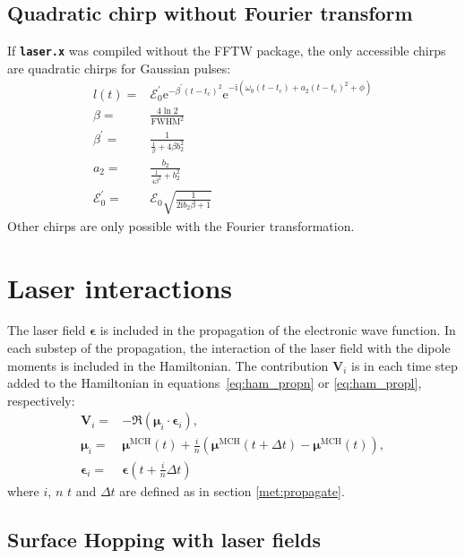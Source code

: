 \documentclass[a4paper,10pt,DIV=15,openany]{scrbook}
\newcommand{\ttt}[1]{\textbf{\texttt{#1}}}
\newcommand{\E}{\ensuremath{\mathrm{e}}}
\newcommand{\I}{\ensuremath{\mathrm{i}}}
\newcommand{\VEC}[1]{\ensuremath{\mathbf{#1}}}
\begin{document}
\subsection{Quadratic chirp without Fourier transform}

If \ttt{laser.x} was compiled without the FFTW package, the only accessible chirps are quadratic chirps for Gaussian pulses:
\begin{align}
  l(t)=&
  \mathcal{E}_0^\prime
  \E^{-\beta^\prime(t-t_c)^2}
  \E^{-\I\left(
    \omega_0(t-t_c)+a_2(t-t_c)^2+\phi
  \right)}\\
  \beta=&\frac{4\ln 2}{\mathrm{FWHM}^2}\\
  \beta^\prime=&\frac{1}{\frac{1}{\beta}+4\beta b_2^2}\\
  a_2=&\frac{b_2}{\frac{1}{4\beta^2}+b^2_2}\\
  \mathcal{E}_0^\prime=&\mathcal{E}_0\sqrt{\frac{1}{2\I b_2\beta+1}}
\end{align}
Other chirps are only possible with the Fourier transformation.



\section{Laser interactions}\label{met:laser}

The laser field $\boldsymbol{\epsilon}$ is included in the propagation of the electronic wave function. In each substep of the propagation, the interaction of the laser field with the dipole moments is included in the Hamiltonian. The contribution $\VEC{V}_i$ is in each time step added to the Hamiltonian in equations~\eqref{eq:ham_propn} or \eqref{eq:ham_propl}, respectively:
\begin{align}
  \VEC{V}_i=&
  -
  \Re\left(
    \boldsymbol{\mu}_i\cdot
    \boldsymbol{\epsilon}_i
  \right),\\
  \boldsymbol{\mu}_i=&
  \boldsymbol{\mu}^{\text{MCH}}(t) + \frac{i}{n}
  \left(
    \boldsymbol{\mu}^{\text{MCH}}(t+\Delta t)-\boldsymbol{\mu}^{\text{MCH}}(t)
  \right),\\
  \boldsymbol{\epsilon}_i=&\boldsymbol{\epsilon}\left(t+\frac{i}{n}\Delta t\right)
\end{align}
where $i$, $n$ $t$ and $\Delta t$ are defined as in section \ref{met:propagate}.

\subsection{Surface Hopping with laser fields}
\end{document}
